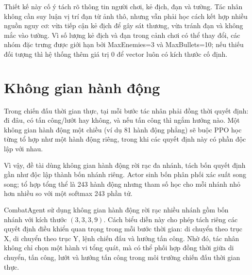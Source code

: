 
Thiết kế này cố ý tách rõ thông tin người chơi, kẻ địch, đạn và tường. Tác nhân không cần suy luận vị trí đạn từ ảnh thô, nhưng vẫn phải học cách kết hợp nhiều nguồn nguy cơ: vừa tiếp cận kẻ địch để gây sát thương, vừa tránh đạn và không mắc vào tường. Vì số lượng kẻ địch và đạn trong cảnh chơi có thể thay đổi, các nhóm đặc trưng được giới hạn bởi MaxEnemies=3 và MaxBullets=10; nếu thiếu đối tượng thì hệ thống thêm giá trị 0 để vector luôn có kích thước cố định.

\section{Không gian hành động}

Trong chiến đấu thời gian thực, tại mỗi bước tác nhân phải đồng thời quyết định: đi đâu, có tấn công/lướt hay không, và nếu tấn công thì ngắm hướng nào. Một không gian hành động một chiều (ví dụ 81 hành động phẳng) sẽ buộc PPO học từng tổ hợp như một hành động riêng, trong khi các quyết định này có phần độc lập với nhau.

Vì vậy, đề tài dùng không gian hành động rời rạc đa nhánh, tách bốn quyết định gần như độc lập thành bốn nhánh riêng. Actor sinh bốn phân phối xác suất song song; tổ hợp tổng thể là 243 hành động nhưng tham số học cho mỗi nhánh nhỏ hơn nhiều so với một softmax 243 phần tử.

CombatAgent sử dụng không gian hành động rời rạc nhiều nhánh gồm bốn nhánh với kích thước $(3,3,3,9)$. Cách biểu diễn này cho phép tách riêng các quyết định điều khiển quan trọng trong mỗi bước thời gian: di chuyển theo trục X, di chuyển theo trục Y, lệnh chiến đấu và hướng tấn công. Nhờ đó, tác nhân không chỉ chọn một hành vi tổng quát, mà có thể phối hợp đồng thời giữa di chuyển, tấn công, lướt và hướng tấn công trong môi trường chiến đấu thời gian thực.

